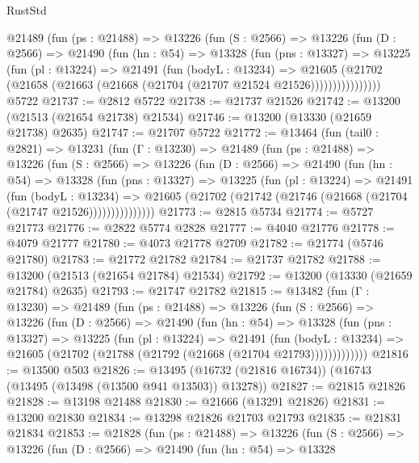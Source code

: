 \begin{lexlean}{RustStd}
\begin{coremodule}
        @21489
          (fun (ps : @21488) =>
          @13226
            (fun (S : @2566) =>
            @13226
              (fun (D : @2566) =>
              @21490
                (fun (hn : @54) =>
                @13328
                  (fun (pns : @13327) =>
                  @13225
                    (fun (pl : @13224) =>
                    @21491
                      (fun (bodyL : @13234) =>
                      @21605
                        (@21702
                          (@21658 (@21663 (@21668 (@21704 (@21707 @21524 @21526))))))))))))))))
    @5722
@21737 := @2812 @5722
@21738 := @21737 @21526
@21742 := @13200 (@21513 (@21654 @21738) @21534)
@21746 := @13200 (@13330 (@21659 @21738) @2635)
@21747 := @21707 @5722
@21772 := @13464
    (fun (tail0 : @2821) =>
    @13231
      (fun (Γ : @13230) =>
      @21489
        (fun (ps : @21488) =>
        @13226
          (fun (S : @2566) =>
          @13226
            (fun (D : @2566) =>
            @21490
              (fun (hn : @54) =>
              @13328
                (fun (pns : @13327) =>
                @13225
                  (fun (pl : @13224) =>
                  @21491
                    (fun (bodyL : @13234) =>
                    @21605 (@21702 (@21742 (@21746 (@21668 (@21704 (@21747 @21526)))))))))))))))
@21773 := @2815 @5734
@21774 := @5727 @21773
@21776 := @2822 @5774 @2828
@21777 := @4040 @21776
@21778 := @4079 @21777
@21780 := @4073 @21778 @2709
@21782 := @21774 (@5746 @21780)
@21783 := @21772 @21782
@21784 := @21737 @21782
@21788 := @13200 (@21513 (@21654 @21784) @21534)
@21792 := @13200 (@13330 (@21659 @21784) @2635)
@21793 := @21747 @21782
@21815 := @13482
    (fun (Γ : @13230) =>
    @21489
      (fun (ps : @21488) =>
      @13226
        (fun (S : @2566) =>
        @13226
          (fun (D : @2566) =>
          @21490
            (fun (hn : @54) =>
            @13328
              (fun (pns : @13327) =>
              @13225
                (fun (pl : @13224) =>
                @21491
                  (fun (bodyL : @13234) =>
                  @21605 (@21702 (@21788 (@21792 (@21668 (@21704 @21793)))))))))))))
@21816 := @13500 @503
@21826 := @13495 (@16732 (@21816 @16734)) (@16743 (@13495 (@13498 (@13500 @941 @13503)) @13278))
@21827 := @21815 @21826
@21828 := @13198 @21488
@21830 := @21666 (@13291 @21826)
@21831 := @13200 @21830
@21834 := @13298 @21826 @21703 @21793
@21835 := @21831 @21834
@21853 := @21828
    (fun (ps : @21488) =>
    @13226
      (fun (S : @2566) =>
      @13226
        (fun (D : @2566) =>
        @21490
          (fun (hn : @54) =>
          @13328

\end{coremodule}
\end{lexlean}
